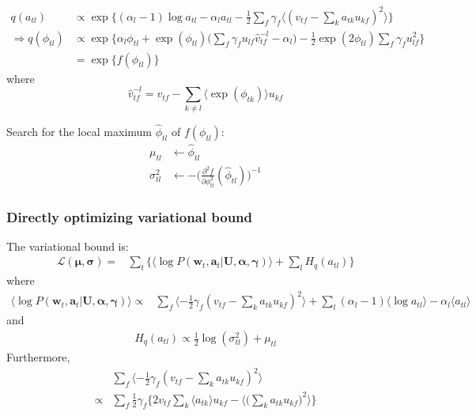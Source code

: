 \documentclass{article}
\begin{document}
\begin{align*}
q(a_{tl}) &\propto \exp \{ (\alpha_l - 1) \log a_{tl} - \alpha_l a_{tl} - \frac{1}{2} \sum_f \gamma_f  \langle (v_{tf} - \sum_k a_{tk} u_{kf})^2 \rangle \}\\
\Rightarrow q(\phi_{tl}) &\propto \exp \biggl\{ \alpha_l  \phi_{tl}  + \exp(\phi_{tl}) \biggl(\sum_f \gamma_f u_{lf} \hat{v}_{tf}^{-l} - \alpha_l\biggl) - \frac{1}{2} \exp(2\phi_{tl}) \sum_f \gamma_f u_{lf}^2  \biggl\}\\
&= \exp\{f(\phi_{tl})\}
\end{align*}
where 
\[
\hat{v}_{tf}^{-l} = v_{tf} - \sum_{k\neq l} \langle \exp(\phi_{tk})\rangle u_{kf}
\]

Search for the local maximum $\hat{\phi}_{tl}$ of $f(\phi_{tl})$:
\begin{align*}
\mu_{tl} &\leftarrow \hat{\phi}_{tl}\\
\sigma_{tl}^2 & \leftarrow -\biggl(\frac{\partial^2 f } {\partial \phi_{tl}^2} (\hat{\phi}_{tl})\biggl)^{-1}
\end{align*}

\subsubsection{Directly optimizing variational bound}

 The variational bound is:
\begin{align*}
\mathcal{L}(\bm{\mu}, \bm{\sigma}) =& \sum_t \biggl\{  \langle \log P(\bm{w}_t, \bm{a}_t | \mathbf{U}, \bm{\alpha}, \bm{\gamma}) \rangle + \sum_l H_q (a_{tl}) \biggl\}
\end{align*}
where
\begin{align*}
 \langle \log P(\bm{w}_t, \bm{a}_t | \mathbf{U}, \bm{\alpha}, \bm{\gamma}) \rangle  \propto & \sum_f \langle -\frac{1}{2} \gamma_f (v_{tf} - \sum_k a_{tk} u_{kf})^2 \rangle + \sum_l  (\alpha_l - 1) \langle \log a_{tl} \rangle - \alpha_l \langle a_{tl} \rangle
\end{align*}
and 
\begin{align*}
H_q (a_{tl}) \propto \frac{1}{2}\log ( \sigma_{tl}^2) + \mu_{tl}
\end{align*}
Furthermore,
\begin{align*}
& \sum_f \langle -\frac{1}{2} \gamma_f (v_{tf} - \sum_k a_{tk} u_{kf})^2 \rangle \\
\propto & \sum_f \frac{1}{2} \gamma_f \biggl\{ 2 v_{tf} \sum_k \langle a_{tk} \rangle u_{kf} -  \langle \big(\sum_k a_{tk} u_{kf}\big)^2 \rangle \biggl\}
\end{align*}
\end{document}
